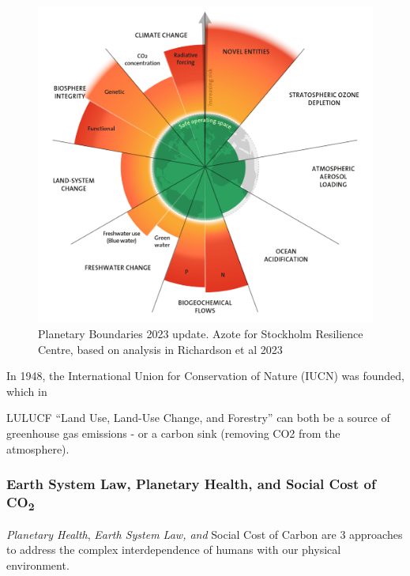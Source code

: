 \documentclass[
  letterpaper,
  DIV=11,
  numbers=noendperiod]{scrartcl}
\begin{document}
\begin{figure}[H]

{\centering \includegraphics[width=1\textwidth,height=\textheight]{./images/sustainability/planetary-boundaries-2023.png}

}

\caption{Planetary Boundaries 2023 update. Azote for Stockholm
Resilience Centre, based on analysis in Richardson et al 2023}

\end{figure}%

In 1948, the International Union for Conservation of Nature (IUCN) was
founded, which in

LULUCF ``Land Use, Land-Use Change, and Forestry'' can both be a source
of greenhouse gas emissions - or a carbon sink (removing CO2 from the
atmosphere).

\subsubsection{\texorpdfstring{Earth System Law, Planetary Health, and
Social Cost of
CO\textsubscript{2}}{Earth System Law, Planetary Health, and Social Cost of CO2}}\label{earth-system-law-planetary-health-and-social-cost-of-co2}

\emph{Planetary Health}, \emph{Earth System Law, and} Social Cost of
Carbon are 3 approaches to address the complex interdependence of humans
with our physical environment.
\end{document}
